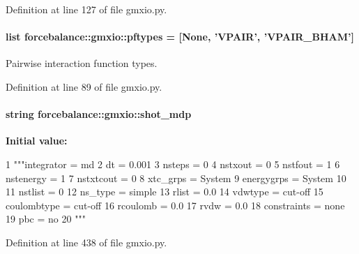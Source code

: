\-Definition at line 127 of file gmxio.\-py.

\hypertarget{namespaceforcebalance_1_1gmxio_a1e3fab50f3ebc3477ff3fb31671e840b}{
\paragraph[{pftypes}]{\setlength{\rightskip}{0pt plus 5cm}list {\bf forcebalance\-::gmxio\-::pftypes} = \mbox{[}\-None, '\-V\-P\-A\-I\-R', '\-V\-P\-A\-I\-R\-\_\-\-B\-H\-A\-M'\mbox{]}}}\label{namespaceforcebalance_1_1gmxio_a1e3fab50f3ebc3477ff3fb31671e840b}


\-Pairwise interaction function types. 



\-Definition at line 89 of file gmxio.\-py.

\hypertarget{namespaceforcebalance_1_1gmxio_a4e18800d0bf6e9be6d3295338d48930d}{
\paragraph[{shot\-\_\-mdp}]{\setlength{\rightskip}{0pt plus 5cm}string {\bf forcebalance\-::gmxio\-::shot\-\_\-mdp}}}\label{namespaceforcebalance_1_1gmxio_a4e18800d0bf6e9be6d3295338d48930d}
{\bfseries \-Initial value\-:}
\begin{DoxyCode}
1 """integrator   = md
2 dt              = 0.001
3 nsteps          = 0
4 nstxout         = 0
5 nstfout         = 1
6 nstenergy       = 1
7 nstxtcout       = 0
8 xtc_grps        = System
9 energygrps      = System
10 
11 nstlist         = 0
12 ns_type         = simple
13 rlist           = 0.0
14 vdwtype         = cut-off
15 coulombtype     = cut-off
16 rcoulomb        = 0.0
17 rvdw            = 0.0
18 constraints     = none
19 pbc             = no
20 """
\end{DoxyCode}


\-Definition at line 438 of file gmxio.\-py.

